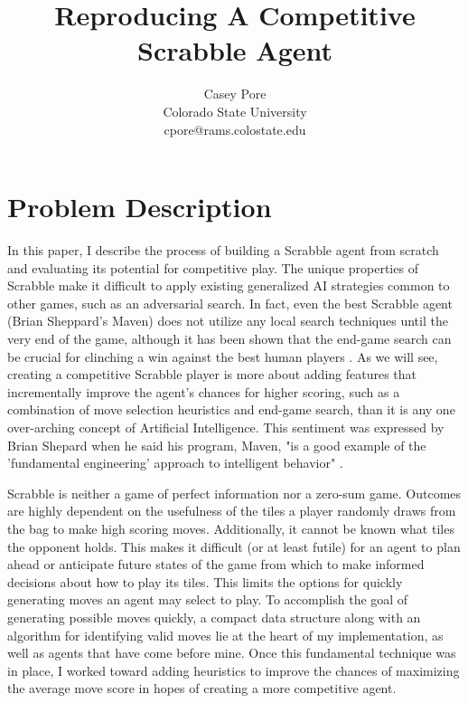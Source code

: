 \documentclass[letterpaper]{article}
\title{Reproducing A Competitive Scrabble Agent}
\author{Casey Pore \\
Colorado State University\\
cpore@rams.colostate.edu\\
}
\begin{document}
\maketitle


\section{Problem Description}
In this paper, I describe the process of building a Scrabble agent from scratch and evaluating its potential for competitive play. The unique properties of Scrabble make it difficult to apply existing generalized AI strategies common to other games, such as an adversarial search. In fact, even the best Scrabble agent (Brian Sheppard's Maven) does not utilize any local search techniques until the very end of the game, although it has been shown that the end-game search can be crucial for clinching a win against the best human players \cite{1sheppard2002}. As we will see, creating a competitive Scrabble player is more about adding features that incrementally improve the agent's chances for higher scoring, such as a combination of move selection heuristics and end-game search, than it is any one over-arching concept of Artificial Intelligence. This sentiment was expressed by Brian Shepard when he said his program, Maven, "is a good example of the 'fundamental engineering' approach to intelligent behavior" \cite{1sheppard2002}.

Scrabble is neither a game of perfect information nor a zero-sum game. Outcomes are highly dependent on the usefulness of the tiles a player randomly draws from the bag to make high scoring moves. Additionally, it cannot be known what tiles the opponent holds. This makes it difficult (or at least futile) for an agent to plan ahead or anticipate future states of the game from which to make informed decisions about how to play its tiles. This limits the options for quickly generating moves an agent may select to play. To accomplish the goal of generating possible moves quickly, a compact data structure along with an algorithm for identifying valid moves lie at the heart of my implementation, as well as agents that have come before mine. Once this fundamental technique was in place, I worked toward adding heuristics to improve the chances of maximizing the average move score in hopes of creating a more competitive agent.
\end{document}
